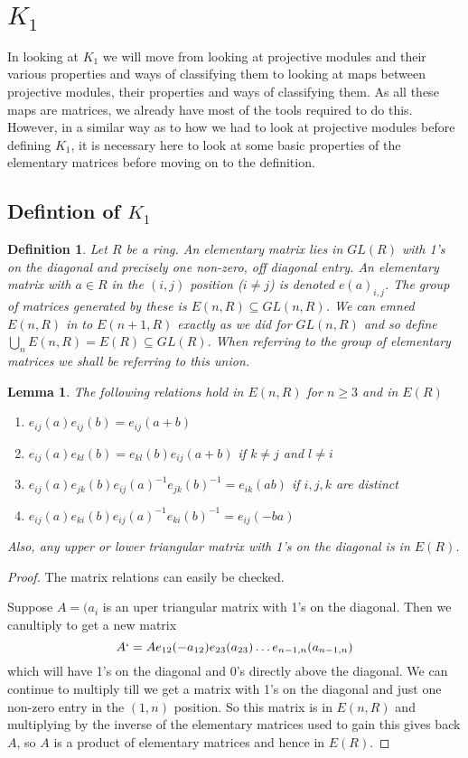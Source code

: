 \documentclass[a4paper,10pt]{article}
\newtheorem{defn}[thm]{Definition}
\newtheorem{lem}[thm]{Lemma}
\begin{document}
\clearpage

\section{$K_{1}$}

In looking at $K_{1}$ we will move from looking at projective modules and their various properties and ways of classifying them to looking at maps between projective modules, their properties and ways of classifying them. As all these maps are matrices, we already have most of the tools required to do this. However, in a similar way as to how we had to look at projective modules before defining $K_{1}$, it is necessary here to look at some basic properties of the elementary matrices before moving on to the definition.

\subsection{Defintion of $K_{1}$}

\begin{defn}
Let $R$ be a ring. An elementary matrix lies in $GL(R)$ with 1's on the diagonal and precisely one non-zero, off diagonal entry. An elementary matrix with $a\in R$ in the $(i,j)$ position ($i\neq j$) is denoted $e(a)_{i,j}$. The group of matrices generated by these is $E(n,R)\subseteq GL(n,R)$. We can emned $E(n,R)$ in to $E(n+1,R)$ exactly as we did for $GL(n,R)$ and so define $\underset{n}{\bigcup} E(n,R)=E(R)\subseteq GL(R)$. When referring to the group of elementary matrices we shall be referring to this union.
\end{defn}

\begin{lem}
The following relations hold in $E(n,R)$ for $n\geq 3$ and in $E(R)$
\begin{enumerate}
 \item $e_{ij}(a)e_{ij}(b)=e_{ij}(a+b)$
 \item $e_{ij}(a)e_{kl}(b)=e_{kl}(b)e_{ij}(a+b)$ if $k\neq j$ and $l\neq i$
 \item $e_{ij}(a)e_{jk}(b)e_{ij}(a)^{-1}e_{jk}(b)^{-1}=e_{ik}(ab)$ if $i,j,k$ are distinct
 \item $e_{ij}(a)e_{ki}(b)e_{ij}(a)^{-1}e_{ki}(b)^{-1}=e_{ij}(-ba)$
\end{enumerate}
Also, any upper or lower triangular matrix with 1's on the diagonal is in $E(R)$.
\end{lem}
\begin{proof}
The matrix relations can easily be checked.

Suppose $A=(a_{i}$ is an uper triangular matrix with 1's on the diagonal. Then we canultiply to get a new matrix $$A`=Ae_{12}(-a_{12})e_{23}(a_{23})\ldots e_{n-1,n}(a_{n-1,n})$$ which will have 1's on the diagonal and 0's directly above the diagonal. We can continue to multiply till we get a matrix with 1's on the diagonal and just one non-zero entry in the $(1,n)$ position. So this matrix is in $E(n,R)$ and multiplying by the inverse of the elementary matrices used to gain this gives back $A$, so $A$ is a product of elementary matrices and hence in $E(R)$.
\end{proof}
\end{document}
